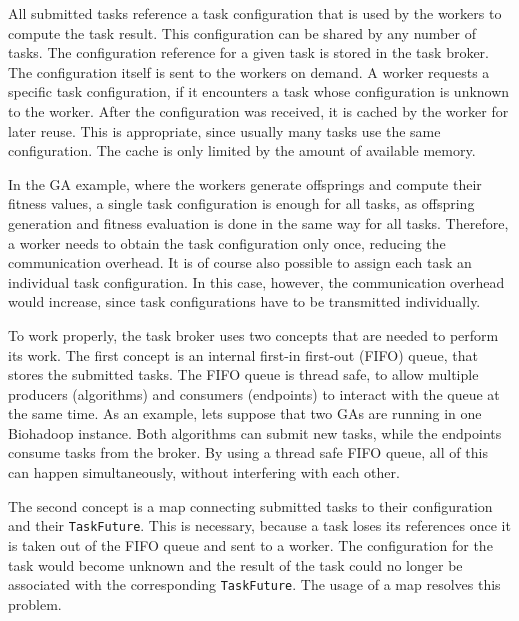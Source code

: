 All submitted tasks reference a task configuration that is used by the workers to compute the task result. This configuration can be shared by any number of tasks. The configuration reference for a given task is stored in the task broker. The configuration itself is sent to the workers on demand. A worker requests a specific task configuration, if it encounters a task whose configuration is unknown to the worker. After the configuration was received, it is cached by the worker for later reuse. This is appropriate, since usually many tasks use the same configuration. The cache is only limited by the amount of available memory.

In the GA example, where the workers generate offsprings and compute their fitness values, a single task configuration is enough for all tasks, as offspring generation and fitness evaluation is done in the same way for all tasks. Therefore, a worker needs to obtain the task configuration only once, reducing the communication overhead. It is of course also possible to assign each task an individual task configuration. In this case, however, the communication overhead would increase, since task configurations have to be transmitted individually.

To work properly, the task broker uses two concepts that are needed to perform its work. The first concept is an internal first-in first-out (FIFO) queue, that stores the submitted tasks. The FIFO queue is thread safe, to allow multiple producers (algorithms) and consumers (endpoints) to interact with the queue at the same time. As an example, lets suppose that two GAs are running in one Biohadoop instance. Both algorithms can submit new tasks, while the endpoints consume tasks from the broker. By using a thread safe FIFO queue, all of this can happen simultaneously, without interfering with each other.

The second concept is a map connecting submitted tasks to their configuration and their \texttt{TaskFuture}. This is necessary, because a task loses its references once it is taken out of the FIFO queue and sent to a worker. The configuration for the task would become unknown and the result of the task could no longer be associated with the corresponding \texttt{TaskFuture}. The usage of a map resolves this problem.

